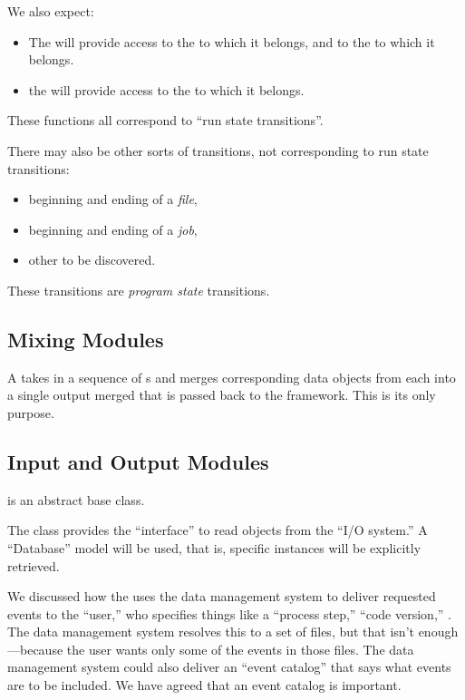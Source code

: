\documentclass[draftmode]{memarticle}
\newcommand{\EDProduct}{\classname{ED\-Product}}
\newcommand{\Event}{\classname{Event}}
\begin{document}
We also expect:
\begin{itemize}
\item The \Event will provide access to the 
to which it belongs,
and to the  to which it belongs.
\item the  will provide access
to the  to which it belongs.
\end{itemize}

These functions all correspond to ``run state transitions''.

There may also be other sorts of transitions,
not corresponding to run state transitions:
\begin{itemize}
\item beginning and ending of a \emph{file},
\item beginning and ending of a \emph{job},
\item \begin{fixme} other to be discovered. \end{fixme}
\end{itemize}
These transitions are \emph{program state} transitions.

\subsection{Mixing Modules}

A  takes in a sequence of  \Event{}s and
merges corresponding data objects from each into a single output merged \Event
that is passed back to the framework.  This is its only purpose.

\subsection{Input and Output Modules}\label{sec:inputoutput}

 is an abstract base class.

The  class provides the ``interface'' to read objects from
the ``I/O system.'' A ``Database'' model will be used, that is, specific
\EDProduct instances will be explicitly retrieved.

We discussed how the  uses the data management system to deliver
requested events to the ``user,'' who specifies things like a ``process step,''
``code version,'' \etc{}.  The data management system resolves this to a set of
files, but that isn't enough---because the user wants only some of
the events in those files. The data management system could also
deliver an ``event catalog'' that says what events are to be included.
We have agreed that an event catalog is important.
\end{document}
